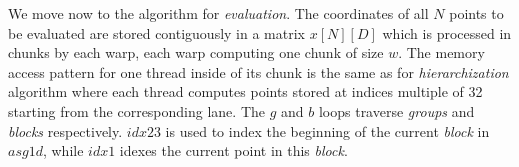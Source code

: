 % 

We move now to the algorithm for \textit{evaluation}. The coordinates of all $N$
points to be evaluated are stored contiguously in a matrix $x[N][D]$ which is
processed in chunks by each warp, each warp computing one chunk of size $w$. The
memory access pattern for one thread inside of its chunk is the same as for
\textit{hierarchization} algorithm where each thread computes points stored at
indices multiple of 32 starting from the corresponding lane. The $g$ and $b$
loops traverse \textit{groups} and \textit{blocks} respectively.
$\textit{idx23}$ is used to index the beginning of the current \textit{block} in
$\textit{asg1d}$, while $idx1$ idexes the current point in this \textit{block}.

